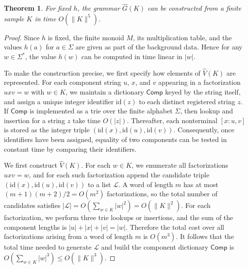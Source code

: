 \documentclass[11pt,a4paper]{article}
\newtheorem{theorem}{Theorem}[section]
\begin{document}
\begin{theorem}\label{thm:poly-build}
For fixed $h$, the grammar $\hat G(K)$ can be constructed from a finite sample $K$ in time $O(\|K\|^5)$.
\end{theorem}

\begin{proof}
Since $h$ is fixed, the finite monoid $M$, its multiplication table, and the values $h(a)$ for $a\in\Sigma$ are given as part of the background data. Hence for any $w\in\Sigma^*$, the value $h(w)$ can be computed in time linear in $|w|$.

To make the construction precise, we first specify how elements of $\hat V(K)$ are represented. For each component string $u$, $x$, and $v$ appearing in a factorization $uxv=w$ with $w\in K$, we maintain a dictionary $\mathsf{Comp}$ keyed by the string itself, and assign a unique integer identifier $\mathrm{id}(z)$ to each distinct registered string $z$. If $\mathsf{Comp}$ is implemented as a trie over the finite alphabet $\Sigma$, then lookup and insertion for a string $z$ take time $O(|z|)$. Thereafter, each nonterminal $[x:u,v]$ is stored as the integer triple $(\mathrm{id}(x),\mathrm{id}(u),\mathrm{id}(v))$. Consequently, once identifiers have been assigned, equality of two components can be tested in constant time by comparing their identifiers.

We first construct $\hat V(K)$. For each $w\in K$, we enumerate all factorizations $uxv=w$, and for each such factorization append the candidate triple $(\mathrm{id}(x),\mathrm{id}(u),\mathrm{id}(v))$ to a list $\mathcal L$. A word of length $m$ has at most $(m+1)(m+2)/2=O(m^2)$ factorizations, so the total number of candidates satisfies $|\mathcal L|=O(\sum_{w\in K}|w|^2)=O(\|K\|^2)$. For each factorization, we perform three trie lookups or insertions, and the sum of the component lengths is $|u|+|x|+|v|=|w|$. Therefore the total cost over all factorizations arising from a word of length $m$ is $O(m^3)$. It follows that the total time needed to generate $\mathcal L$ and build the component dictionary $\mathsf{Comp}$ is $O(\sum_{w\in K}|w|^3)\le O(\|K\|^3)$.


\end{proof}
\end{document}
